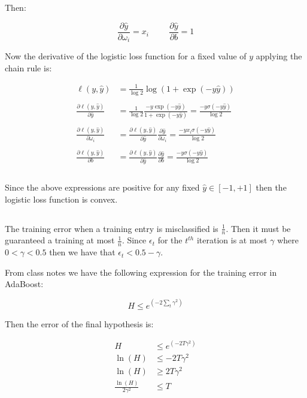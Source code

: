 \documentclass[11pt]{article}
\begin{document}
Then:

$$\frac{\partial\hat{y}}{\partial\omega_i}=x_i \hspace{1cm} \frac{\partial\hat{y}}{\partial b}=1$$

Now the derivative of the logistic loss function for a fixed value of $y$ applying the chain rule is:

\begin{align*} 
\ell(y, \hat{y}) &= \frac{1}{\log 2} \log(1+\exp(-y\hat{y}))\\\\
\frac{\partial\ell(y, \hat{y})}{\partial \hat{y}} &= \frac{1}{\log 2} \frac{-y \exp(-y\hat{y})}{1+ \exp(-y \hat{y})}=\frac{-y \sigma(-y \hat{y})}{\log 2}\\\\
\frac{\partial\ell(y, \hat{y})}{\partial \omega_i} &= \frac{\partial\ell(y, \hat{y})}{\partial \hat{y}}\frac{\partial\hat{y}}{\partial \omega_i}=\frac{-y x_i \sigma(-y \hat{y})}{\log 2}\\\\
\frac{\partial\ell(y, \hat{y})}{\partial b} &= \frac{\partial\ell(y, \hat{y})}{\partial \hat{y}}\frac{\partial\hat{y}}{\partial b}=\frac{-y \sigma(-y \hat{y})}{\log 2}\\\\
\end{align*}

Since the above expressions are positive for any fixed $\hat{y} \in [-1, +1]$ then the logistic loss function is convex.

\subsection{}
The training error when a training entry is misclassified is $\frac{1}{n}$. Then it must be guaranteed a training at most $\frac{1}{n}$. Since $\epsilon_t$ for the $t^{th}$ iteration is at most $\gamma$ where $0<\gamma<0.5$ then we have that $\epsilon_t<0.5-\gamma$.

From class notes we have the following expression for the training error in AdaBoost:

$$H \leq e^{(-2 \sum_{t} \gamma^2)}$$

Then the error of the final hypothesis is:

\begin{align*} 
H &\leq e^{(-2T \gamma^2)}\\
\ln(H) &\leq -2T \gamma^2\\
\ln(H) &\geq 2T \gamma^2\\
\frac{\ln(H)}{2 \gamma^2} &\leq T\\
\end{align*}
\end{document}

